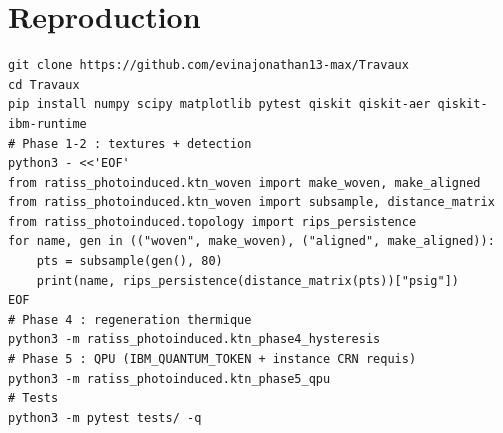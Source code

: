 \documentclass[11pt]{article}
\begin{document}
\appendix

\section{Reproduction}
\label{sec:appendix}

\begin{verbatim}
git clone https://github.com/evinajonathan13-max/Travaux
cd Travaux
pip install numpy scipy matplotlib pytest qiskit qiskit-aer qiskit-ibm-runtime
# Phase 1-2 : textures + detection
python3 - <<'EOF'
from ratiss_photoinduced.ktn_woven import make_woven, make_aligned
from ratiss_photoinduced.ktn_woven import subsample, distance_matrix
from ratiss_photoinduced.topology import rips_persistence
for name, gen in (("woven", make_woven), ("aligned", make_aligned)):
    pts = subsample(gen(), 80)
    print(name, rips_persistence(distance_matrix(pts))["psig"])
EOF
# Phase 4 : regeneration thermique
python3 -m ratiss_photoinduced.ktn_phase4_hysteresis
# Phase 5 : QPU (IBM_QUANTUM_TOKEN + instance CRN requis)
python3 -m ratiss_photoinduced.ktn_phase5_qpu
# Tests
python3 -m pytest tests/ -q
\end{verbatim}
\end{document}
